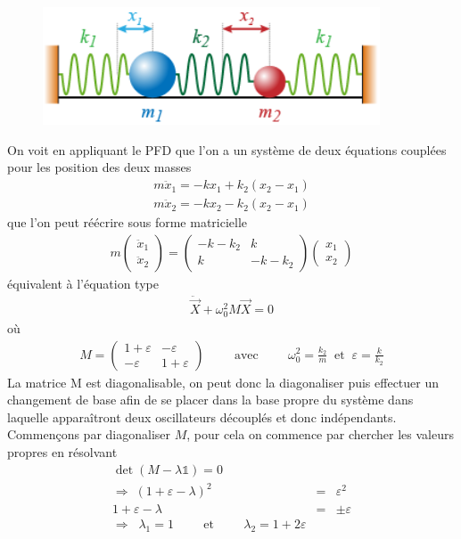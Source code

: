 \documentclass[12pt,prb,aps,epsf]{article}
\begin{document}
\begin{figure}[h]
	\centering \includegraphics[width=10cm]{osc_couples}
\end{figure}
On voit en appliquant le PFD que l'on a un système de deux équations couplées pour les position des deux masses
\begin{eqnarray}
m\ddot{x}_1 = -kx_1 + k_2(x_2-x_1)\\
m\ddot{x}_2 = -kx_2 - k_2(x_2-x_1)
\end{eqnarray}
que l'on peut réécrire sous forme matricielle 
\begin{eqnarray}
m
\begin{pmatrix}
\ddot{x}_1\\
\ddot{x}_2
\end{pmatrix}
= \begin{pmatrix}
- k - k_2& k\\
k & - k - k_2
\end{pmatrix}
\begin{pmatrix}
x_1\\
x_2
\end{pmatrix}
\end{eqnarray}
équivalent à l'équation type 
\begin{eqnarray}
\ddot{\vec{X}} + \omega_0^2 M\vec{X} = 0
\end{eqnarray}
où
\begin{eqnarray}
M = \begin{pmatrix}
1+\varepsilon & -\varepsilon\\
- \varepsilon & 1+ \varepsilon
\end{pmatrix}
\hspace{1cm}\mathrm{avec}\hspace{1cm} \omega_0^2 = \frac{k_2}{m}\;\;\mathrm{et}\;\; \varepsilon = \frac{k}{k_2}
\end{eqnarray}
La matrice M est diagonalisable, on peut donc la diagonaliser puis effectuer un changement de base afin de se placer dans la base propre du système dans laquelle apparaîtront deux oscillateurs découplés et donc indépendants. Commençons par diagonaliser $M$, pour cela on commence par chercher les valeurs propres en résolvant 
\begin{eqnarray}
\det(M - \lambda \mathbb{1}) = 0\\
\Rightarrow\; (1+\varepsilon-\lambda)^2 &=& \varepsilon^2\\
1 + \varepsilon - \lambda &=& \pm \varepsilon\\
\Rightarrow\;\;\lambda_1 = 1\hspace{1cm}\mathrm{et}\hspace{1cm}\lambda_2 = 1+2\varepsilon
\end{eqnarray}
\end{document}

